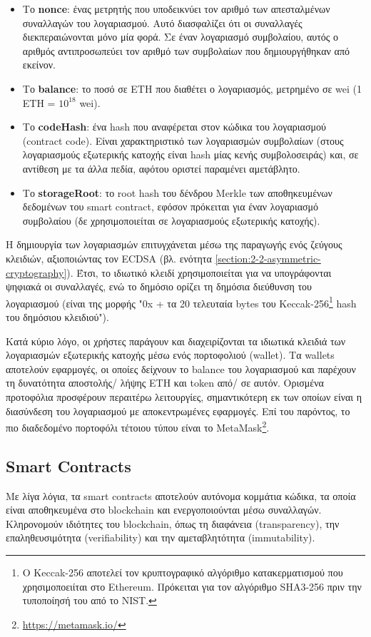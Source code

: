 \begin{itemize}
	\item Το \textbf{nonce}: ένας μετρητής που υποδεικνύει τον αριθμό των απεσταλμένων συναλλαγών του λογαριασμού. Αυτό διασφαλίζει ότι οι συναλλαγές διεκπεραιώνονται μόνο μία φορά. Σε έναν λογαριασμό συμβολαίου, αυτός ο αριθμός αντιπροσωπεύει τον αριθμό των συμβολαίων που δημιουργήθηκαν από εκείνον.

	\item Το \textbf{balance}: το ποσό σε ETH που διαθέτει ο λογαριασμός, μετρημένο σε wei (1 ETH = $10^{18}$ wei).

	\item Το \textbf{codeHash}: ένα hash που αναφέρεται στον κώδικα του λογαριασμού (contract code). Είναι χαρακτηριστικό των λογαριασμών συμβολαίων (στους λογαριασμούς εξωτερικής κατοχής είναι hash μίας κενής συμβολοσειράς) και, σε αντίθεση με τα άλλα πεδία, αφότου οριστεί παραμένει αμετάβλητο.

	\item Το \textbf{storageRoot}: το root hash του δένδρου Merkle των αποθηκευμένων δεδομένων του smart contract, εφόσον πρόκειται για έναν λογαριασμό συμβολαίου (δε χρησιμοποιείται σε λογαριασμούς εξωτερικής κατοχής).
\end{itemize}

Η δημιουργία των λογαριασμών επιτυγχάνεται μέσω της παραγωγής ενός ζεύγους κλειδιών, αξιοποιώντας τον 
ECDSA (βλ. ενότητα \ref{section:2-2-asymmetric-cryptography}). Έτσι, το ιδιωτικό κλειδί χρησιμοποιείται για να υπογράφονται ψηφιακά οι συναλλαγές, ενώ το δημόσιο ορίζει τη δημόσια διεύθυνση του λογαριασμού (είναι της μορφής "0x + τα 20 τελευταία bytes του Keccak-256\footnote{Ο Keccak-256 αποτελεί τον κρυπτογραφικό αλγόριθμο κατακερματισμού που χρησιμοποειίται στο Ethereum. Πρόκειται για τον αλγόριθμο SHA3-256 πριν την τυποποίησή του από το NIST.} hash του δημόσιου κλειδιού").

Κατά κύριο λόγο, οι χρήστες παράγουν και διαχειρίζονται τα ιδιωτικά κλειδιά των λογαριασμών εξωτερικής κατοχής μέσω ενός πορτοφολιού (wallet). Τα wallets αποτελούν εφαρμογές, οι οποίες δείχνουν το balance του λογαριασμού και παρέχουν τη δυνατότητα αποστολής/ λήψης ETH και token από/ σε αυτόν. Ορισμένα προτοφόλια προσφέρουν περαιτέρω λειτουργίες, σημαντικότερη εκ των οποίων είναι η διασύνδεση του λογαριασμού με αποκεντρωμένες εφαρμογές. Επί του παρόντος, το πιο διαδεδομένο πορτοφόλι τέτοιου τύπου είναι το MetaMask\footnote{\url{https://metamask.io/}}.

\subsection{Smart Contracts}
Με λίγα λόγια, τα smart contracts αποτελούν αυτόνομα κομμάτια κώδικα, τα οποία είναι αποθηκευμένα στο blockchain και ενεργοποιούνται μέσω συναλλαγών. Κληρονομούν ιδιότητες του blockchain, όπως τη διαφάνεια (transparency), την επαληθευσιμότητα (verifiability) και την αμεταβλητότητα (immutability).

